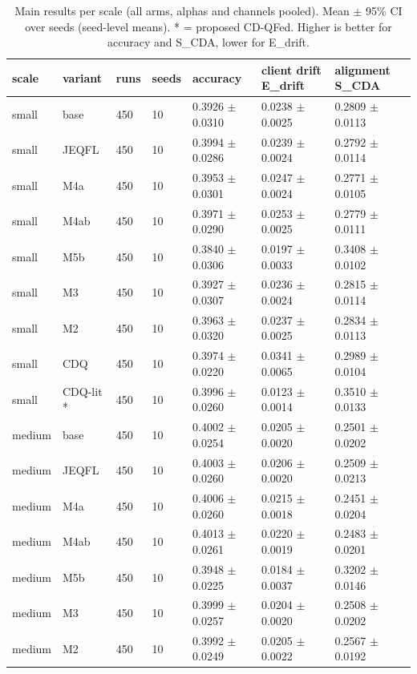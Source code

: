 \begin{table}[t]\centering\footnotesize
\caption{Main results per scale (all arms, alphas and channels pooled). Mean $\pm$ 95\% CI over seeds (seed-level means). * = proposed CD-QFed. Higher is better for accuracy and S\_CDA, lower for E\_drift.}\label{tab:table1_main_results}
\begin{tabular}{lllllll}
\toprule
scale & variant & runs & seeds & accuracy & client drift E\_drift & alignment S\_CDA \\
\midrule
small & base & 450 & 10 & 0.3926 $\pm$ 0.0310 & 0.0238 $\pm$ 0.0025 & 0.2809 $\pm$ 0.0113 \\
small & JEQFL & 450 & 10 & 0.3994 $\pm$ 0.0286 & 0.0239 $\pm$ 0.0024 & 0.2792 $\pm$ 0.0114 \\
small & M4a & 450 & 10 & 0.3953 $\pm$ 0.0301 & 0.0247 $\pm$ 0.0024 & 0.2771 $\pm$ 0.0105 \\
small & M4ab & 450 & 10 & 0.3971 $\pm$ 0.0290 & 0.0253 $\pm$ 0.0025 & 0.2779 $\pm$ 0.0111 \\
small & M5b & 450 & 10 & 0.3840 $\pm$ 0.0306 & 0.0197 $\pm$ 0.0033 & 0.3408 $\pm$ 0.0102 \\
small & M3 & 450 & 10 & 0.3927 $\pm$ 0.0307 & 0.0236 $\pm$ 0.0024 & 0.2815 $\pm$ 0.0114 \\
small & M2 & 450 & 10 & 0.3963 $\pm$ 0.0320 & 0.0237 $\pm$ 0.0025 & 0.2834 $\pm$ 0.0113 \\
small & CDQ & 450 & 10 & 0.3974 $\pm$ 0.0220 & 0.0341 $\pm$ 0.0065 & 0.2989 $\pm$ 0.0104 \\
small & CDQ-lit * & 450 & 10 & 0.3996 $\pm$ 0.0260 & 0.0123 $\pm$ 0.0014 & 0.3510 $\pm$ 0.0133 \\
medium & base & 450 & 10 & 0.4002 $\pm$ 0.0254 & 0.0205 $\pm$ 0.0020 & 0.2501 $\pm$ 0.0202 \\
medium & JEQFL & 450 & 10 & 0.4003 $\pm$ 0.0260 & 0.0206 $\pm$ 0.0020 & 0.2509 $\pm$ 0.0213 \\
medium & M4a & 450 & 10 & 0.4006 $\pm$ 0.0260 & 0.0215 $\pm$ 0.0018 & 0.2451 $\pm$ 0.0204 \\
medium & M4ab & 450 & 10 & 0.4013 $\pm$ 0.0261 & 0.0220 $\pm$ 0.0019 & 0.2483 $\pm$ 0.0201 \\
medium & M5b & 450 & 10 & 0.3948 $\pm$ 0.0225 & 0.0184 $\pm$ 0.0037 & 0.3202 $\pm$ 0.0146 \\
medium & M3 & 450 & 10 & 0.3999 $\pm$ 0.0257 & 0.0204 $\pm$ 0.0020 & 0.2508 $\pm$ 0.0202 \\
medium & M2 & 450 & 10 & 0.3992 $\pm$ 0.0249 & 0.0205 $\pm$ 0.0022 & 0.2567 $\pm$ 0.0192 \\

\end{tabular}
\end{table}
